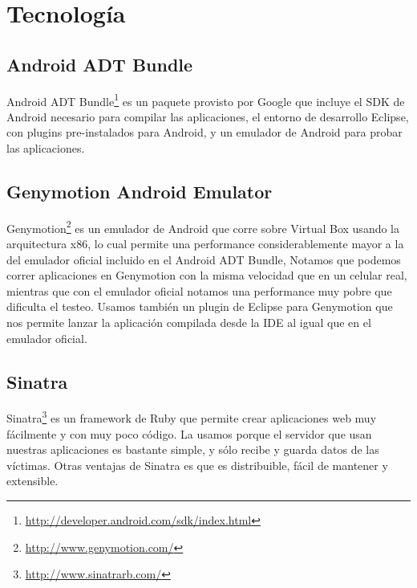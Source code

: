 \section{Tecnología}
	\subsection{Android ADT Bundle} 
		Android ADT Bundle\footnote{ \url{http://developer.android.com/sdk/index.html}} es un paquete provisto por Google que incluye el SDK de Android necesario para compilar las aplicaciones, el entorno de desarrollo Eclipse, con plugins pre-instalados para Android, y un emulador de Android para probar las aplicaciones.
		
	\subsection{Genymotion Android Emulator}
		Genymotion\footnote{\url{http://www.genymotion.com/}} es un emulador de Android que corre sobre Virtual Box usando la arquitectura x86, lo cual permite una performance considerablemente mayor a la del emulador oficial incluido en el Android ADT Bundle, Notamos que podemos correr aplicaciones en Genymotion con la misma velocidad que en un celular real, mientras que con el emulador oficial notamos una performance muy pobre que dificulta el testeo. Usamos también un plugin de Eclipse para Genymotion que nos permite lanzar la aplicación compilada desde la IDE al igual que en el emulador oficial.
		
	\subsection{Sinatra}
		Sinatra\footnote{\url{http://www.sinatrarb.com/}} es un framework de Ruby que permite crear aplicaciones web muy fácilmente y con muy poco código. La usamos porque el servidor que usan nuestras aplicaciones es bastante simple, y sólo recibe y guarda datos de las víctimas. Otras ventajas de Sinatra es que es distribuible, fácil de mantener y extensible.